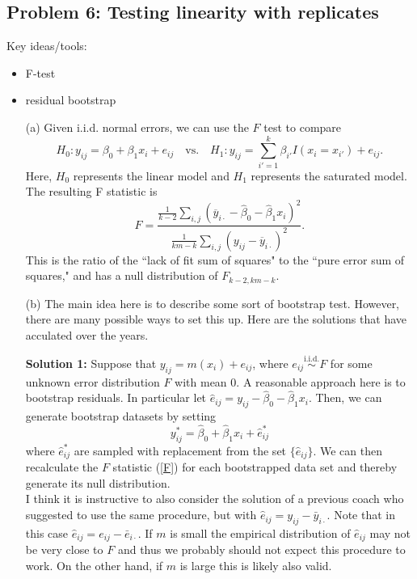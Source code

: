 \subsection*{Problem 6: Testing linearity with replicates}
Key ideas/tools:
\begin{itemize}
\item F-test
\item residual bootstrap
\end{itemize}
\begin{itemize}
\item[(a)] Given i.i.d. normal errors, we can use the $F$ test to compare 
	\begin{equation}
	H_0: y_{ij} = \beta_0 + \beta_1 x_i + e_{ij} \quad \text{vs.} \quad H_1: y_{ij} = \sum_{i' = 1}^k \beta_{i'} I(x_i = x_{i'}) + e_{ij}.
	\end{equation}
	Here, $H_0$ represents the linear model and $H_1$ represents the saturated model.
	The resulting F statistic is
	\begin{equation}
	F = \frac{\frac{1}{k - 2}\sum_{i, j}(\overline y_{i\cdot} - \hat \beta_0 - \hat \beta_1 x_i)^2}{\frac{1}{km-k}\sum_{i, j}(y_{ij} - \overline y_{i\cdot})^2}.
	\label{F}
	\end{equation}
	This is the ratio of the ``lack of fit sum of squares" to the ``pure error sum of squares," and has a null distribution of $F_{k-2, km-k}$.

\item[(b)] The main idea here is to describe some sort of bootstrap test. However, there are many possible ways to set this up. Here are the solutions that have acculated over the years.

\textbf{Solution 1:} Suppose that $y_{ij} = m(x_i) + e_{ij}$, where $e_{ij} \overset{\text{i.i.d.}}\sim F$ for some unknown error distribution $F$ with mean $0$.  A reasonable approach here is to bootstrap residuals. In particular let $\hat{e}_{ij} =  y_{ij} - \hat{\beta}_0 - \hat{\beta}_1x_i$. Then, we can generate bootstrap datasets by setting
\[
	y_{ij}^* = \hat \beta_0 + \hat \beta_1 x_{i} + \hat{e}_{ij}^*
\]
where $\hat{e}_{ij}^*$ are sampled with replacement from the set $\{\hat e_{ij}\}$. We can then recalculate the $F$ statistic (\ref{F}) for each bootstrapped data set and thereby generate its null distribution.\\

I think it is instructive to also consider the solution of a previous coach who suggested to use the same procedure, but with $\hat{e}_{ij}  = y_{ij} - \bar{y}_{i\cdot}$. Note that in this case $\hat{e}_{ij} = e_{ij} - \bar{e}_{i \cdot}$. If $m$ is small the empirical distribution of $\hat{e}_{ij}$ may not be very close to $F$ and thus we probably should not expect this procedure to work. On the other hand, if $m$ is large this is likely also valid.\\  
    

\end{itemize}

